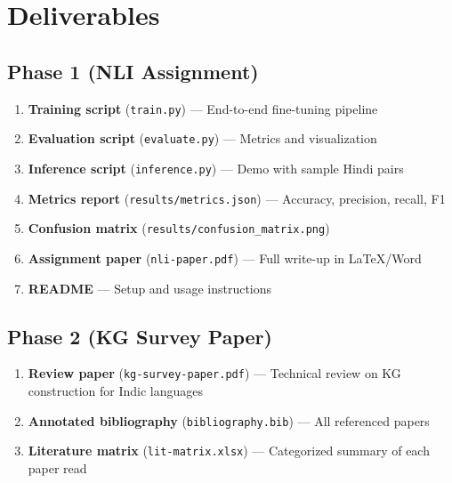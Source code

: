 \section{Deliverables}

\subsection{Phase 1 (NLI Assignment)}

\begin{enumerate}[nosep]
    \item \textbf{Training script} (\texttt{train.py}) --- End-to-end fine-tuning pipeline
    \item \textbf{Evaluation script} (\texttt{evaluate.py}) --- Metrics and visualization
    \item \textbf{Inference script} (\texttt{inference.py}) --- Demo with sample Hindi pairs
    \item \textbf{Metrics report} (\texttt{results/metrics.json}) --- Accuracy, precision, recall, F1
    \item \textbf{Confusion matrix} (\texttt{results/confusion\_matrix.png})
    \item \textbf{Assignment paper} (\texttt{nli-paper.pdf}) --- Full write-up in LaTeX/Word
    \item \textbf{README} --- Setup and usage instructions
\end{enumerate}

\subsection{Phase 2 (KG Survey Paper)}

\begin{enumerate}[nosep]
    \item \textbf{Review paper} (\texttt{kg-survey-paper.pdf}) --- Technical review on KG construction for Indic languages
    \item \textbf{Annotated bibliography} (\texttt{bibliography.bib}) --- All referenced papers
    \item \textbf{Literature matrix} (\texttt{lit-matrix.xlsx}) --- Categorized summary of each paper read
\end{enumerate}
